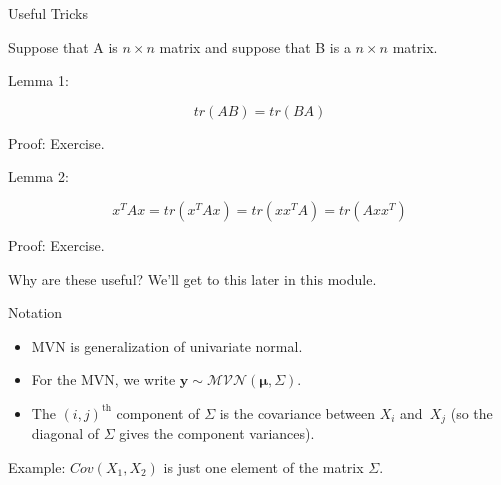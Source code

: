 \documentclass[ignorenonframetext,]{beamer}
\newcommand{\bmu}{\bm{\mu}}
\begin{document}

\begin{frame}{Useful Tricks}

Suppose that A is \(n \times n\) matrix and suppose that B is a
\(n \times n\) matrix.

Lemma 1:

\[tr(AB) = tr(BA)\]

Proof: Exercise.

Lemma 2:

\[x^TAx = tr(x^TAx) = tr(xx^TA) = tr(Axx^T)\]

Proof: Exercise.

Why are these useful? We'll get to this later in this module.

\end{frame}

\begin{frame}{Notation}

\begin{itemize}
\item MVN is generalization of univariate normal.
\item For the MVN, we write $\bm{y} \sim
\mathcal{MVN}(\bmu,\Sigma)$. 
\item The $(i,j)^{\text{th}}$
component of $\Sigma$ is the covariance between $X_i$ and~$X_j$ (so
the diagonal of $\Sigma$ gives the component variances).
\end{itemize}

Example: \(Cov(X_1, X_2)\) is just one element of the matrix \(\Sigma.\)

\end{frame}
\end{document}
